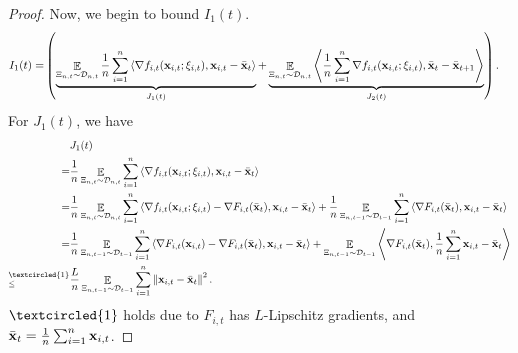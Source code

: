\documentclass{article}
\begin{document}
\begin{proof}
Now, we begin to bound $I_1(t)$.
\begin{align}
\nonumber
I_1(t) = &    \left( \underbrace{ \mathop{\mathbb{E}}_{ \Xi_{n,t} \sim \mathcal{D}_{n,t} }\frac{1}{n}\sum_{i=1}^n\left\langle\nabla f_{i,t}({\bf x}_{i,t}; \xi_{i,t}), {\bf x}_{i,t} - \bar{{\bf x}}_t  \right\rangle }_{J_1(t)} +  \underbrace{ \mathop{\mathbb{E}}_{ \Xi_{n,t} \sim \mathcal{D}_{n,t} }\left\langle\frac{1}{n}\sum_{i=1}^n \nabla f_{i,t}({\bf x}_{i,t};\xi_{i,t}), \bar{{\bf x}}_t - \bar{{\bf x}}_{t+1}  \right\rangle}_{J_2(t)} \right).
\end{align} For $J_1(t)$, we have
\begin{align}
\nonumber
& J_1(t) \\ \nonumber 
= & \frac{1}{n}\EE_{ \Xi_{n,t} \sim \Dcal_{n,t} }\sum_{i=1}^n\lrangle{\nabla f_{i,t}(\x_{i,t}; \xi_{i,t}), \x_{i,t} - \bar{\x}_t } \\ \nonumber
= & \frac{1}{n}\EE_{ \Xi_{n,t} \sim \Dcal_{n,t} } \sum_{i=1}^n\lrangle{\nabla f_{i,t}(\x_{i,t}; \xi_{i,t}) - \nabla F_{i,t}(\bar{\x}_t), \x_{i,t} - \bar{\x}_t } + \frac{1}{n}\EE_{ \Xi_{n,t-1} \sim \Dcal_{t-1} }\sum_{i=1}^n\lrangle{\nabla F_{i,t}(\bar{\x}_t), \x_{i,t} - \bar{\x}_t } \\ \nonumber
= & \frac{1}{n}\EE_{ \Xi_{n,t-1} \sim \Dcal_{t-1} }\sum_{i=1}^n\lrangle{\nabla F_{i,t}(\x_{i,t}) - \nabla F_{i,t}(\bar{\x}_t), \x_{i,t} - \bar{\x}_t } + \EE_{ \Xi_{n,t-1} \sim \Dcal_{t-1} }\lrangle{\nabla F_{i,t}(\bar{\x}_t), \frac{1}{n}\sum_{i=1}^n\x_{i,t} - \bar{\x}_t } \\ \nonumber
\refabovecir{\le}{\textcircled{1}} & \frac{L}{n}\EE_{ \Xi_{n,t-1} \sim \Dcal_{t-1} }\sum_{i=1}^n \lrnorm{\x_{i,t} - \bar{\x}_t}^2. 
\end{align} $\textcircled{1}$ holds due to $F_{i,t}$ has $L$-Lipschitz gradients, and $\bar{{\bf x}}_t = \frac{1}{n}\sum_{i=1}^n {\bf x}_{i,t}$.


\end{proof}
\end{document}
